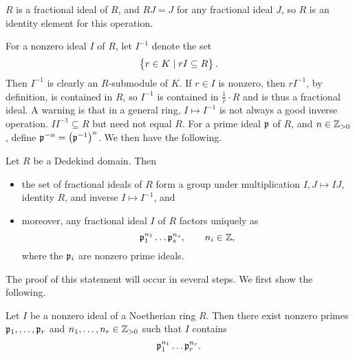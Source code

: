 \begin{note*}
$ R $ is a fractional ideal of $ R $, and $ RJ = J $ for any fractional ideal $ J $, so $ R $ is an identity element for this operation.
\end{note*}

For a nonzero ideal $ I $ of $ R $, let $ I^{-1} $ denote the set
$$ \cbr{r \in K \mid rI \subseteq R}. $$
Then $ I^{-1} $ is clearly an $ R $-submodule of $ K $. If $ r \in I $ is nonzero, then $ rI^{-1} $, by definition, is contained in $ R $, so $ I^{-1} $ is contained in $ \tfrac{1}{r} \cdot R $ and is thus a fractional ideal. A warning is that in a general ring, $ I \mapsto I^{-1} $ is not always a good inverse operation. $ II^{-1} \subseteq R $ but need not equal $ R $. For a prime ideal $ \mathfrak{p} $ of $ R $, and $ n \in \mathbb{Z}_{> 0} $, define $ \pp^{-n} = \br{\pp^{-1}}^n $. We then have the following.

\begin{theorem}
Let $ R $ be a Dedekind domain. Then
\begin{itemize}
\item the set of fractional ideals of $ R $ form a group under multiplication $ I, J \mapsto IJ $, identity $ R $, and inverse $ I \mapsto I^{-1} $, and
\item moreover, any fractional ideal $ I $ of $ R $ factors uniquely as
$$ \mathfrak{p}_1^{n_1} \dots \mathfrak{p}_s^{n_s}, \qquad n_i \in \mathbb{Z}, $$
where the $ \mathfrak{p}_i $ are nonzero prime ideals.
\end{itemize}
\end{theorem}

\pagebreak


The proof of this statement will occur in several steps. We first show the following.

\begin{proposition}
Let $ I $ be a nonzero ideal of a Noetherian ring $ R $. Then there exist nonzero primes $ \mathfrak{p}_1, \dots, \mathfrak{p}_r $ and $ n_1, \dots, n_r \in \mathbb{Z}_{> 0} $ such that $ I $ contains
$$ \mathfrak{p}_1^{n_1} \dots \mathfrak{p}_r^{n_r}. $$
\end{proposition}

